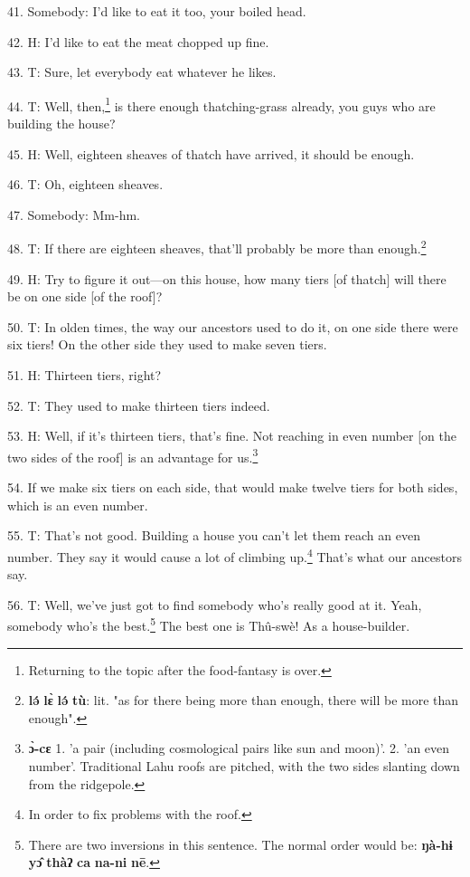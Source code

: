 41. Somebody: I'd like to eat it too, your boiled head.

42. H: I'd like to eat the meat chopped up fine.

43. T: Sure, let everybody eat whatever he likes.

44. T: Well, then,\footnote{Returning to the topic after the food-fantasy is over.} is there enough thatching-grass already, you guys who are
building the house?

45. H: Well, eighteen sheaves of thatch have arrived, it should be enough.

46. T: Oh, eighteen sheaves.

47. Somebody: Mm-hm.

48. T: If there are eighteen sheaves, that'll probably be more than enough.\footnote{\textbf{lə́} \textbf{lɛ̀} \textbf{lə́} \textbf{tù}: lit. "as for there being more than enough, there will be more than enough".}

49. H: Try to figure it out---on this house, how many tiers [of thatch] will there
be on one side [of the roof]?

50. T: In olden times, the way our ancestors used to do it, on one side there were
six tiers! On the other side they used to make seven tiers.

51. H: Thirteen tiers, right?

52. T: They used to make thirteen tiers indeed.

53. H: Well, if it's thirteen tiers, that's fine. Not reaching in even number
[on the two sides of the roof] is an advantage for us.\footnote{\textbf{ɔ̀-cɛ} 1. 'a pair (including cosmological pairs like sun and moon)'. 2. 'an even number'. Traditional Lahu roofs are pitched, with the two sides slanting down from the ridgepole.}

54. If we make six tiers on each side, that would make twelve tiers for both sides,
which is an even number.

55. T: That's not good. Building a house you can't let them reach an even number.
They say it would cause a lot of climbing up.\footnote{In order to fix problems with the roof.} That's what our ancestors say.

56. T: Well, we've just got to find somebody who's really good at it. Yeah, somebody
who's the best.\footnote{There are two inversions in this sentence. The normal order would be: \textbf{ŋà-hɨ} \textbf{yɔ̂} \textbf{thàʔ} \textbf{ca} \textbf{na-ni} \textbf{nē}.} The best one is Thû-swè! As a house-builder.

